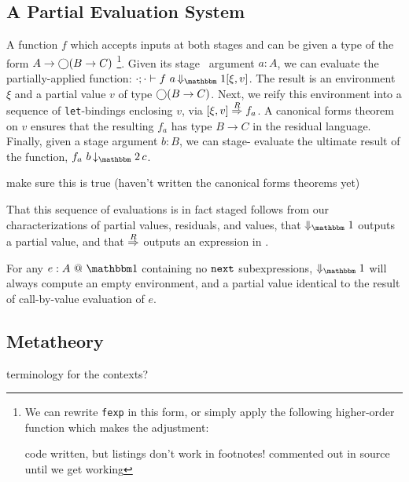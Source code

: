 \subsection {A Partial Evaluation System}

A function $f$ which accepts inputs at both stages \bbone{} and \bbtwo{} can be
given a type of the form $A\to\bigcirc(B\to C)$%
\footnote{We can rewrite \texttt{fexp} in this form, or simply apply the following
higher-order function which makes the adjustment:

\TODO code written, but listings don't work in footnotes! commented out in source until we get working
}.
Given its stage \bbone\ argument $a:A$, we can evaluate the partially-applied
function:
$\cdot;\cdot\vdash f~a \mathop{\redonesym} [\xi,v]$.
The result is an environment $\xi$ and a partial value $v$ of type $\bigcirc(B\to
C)$. Next, we reify this environment into a sequence of \verb|let|-bindings
enclosing $v$, via $[{\xi},{v}]\overset{R}\Rightarrow{f_a}$. A canonical forms theorem on $v$
ensures that the resulting $f_a$ has type $B\to C$ in the residual language.
Finally, given a stage \bbtwo{} argument $b:B$, we can stage-\bbtwo{} evaluate
the ultimate result of the function, $f_a~b \mathop{\tworedsym} c$.

\TODO make sure this is true (haven't written the canonical forms theorems yet)

That this sequence of evaluations is in fact staged follows from our
characterizations of partial values, residuals, and values, that $\redonesym$
outputs a partial value, and that $\overset{R}\Rightarrow$ outputs an expression in \langTwo.

\begin{remark}
For any $\colone{e}{A}$ containing no ${\tt next}$ subexpressions, $\redonesym$ will
always compute an empty environment, and a partial value identical to the result
of call-by-value evaluation of $e$.
\end{remark}

\subsection{Metatheory}

\noindent\TODO terminology for the contexts?

